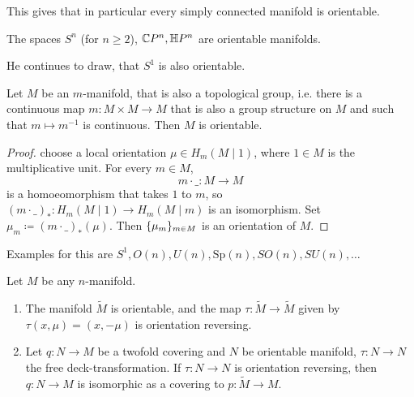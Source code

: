 \documentclass[language=english]{TemplateLecture}
\begin{document}
This gives that in particular every simply connected manifold is orientable.

\begin{example}
    The spaces \(S^n\) (for \(n \geq 2\)), \(\mathbb{C} P^n, \mathbb{H} P^n\) are orientable manifolds.

    He continues to draw, that \(S^1\) is also orientable.

    Let \(M\) be an \(m\)-manifold, that is also a topological group, i.e. there is a continuous map \(m\colon M \times M \to M\) that is also a group structure on \(M\) and such that \(m \mapsto m^{-1}\) is continuous. Then \(M\) is orientable.

    \begin{proof}
        choose a local orientation \(\mu \in H_m(M \mid 1)\), where \(1 \in M\) is the multiplicative unit. For every \(m \in M\),
        \[m\cdot \_\colon M \to M\]
        is a homoeomorphism that takes \(1\) to \(m\), so \((m\cdot \_)_* \colon H_m(M \mid1) \to H_m(M \mid m)\) is an isomorphism. Set \(\mu_m\coloneq (m\cdot \_)_*(\mu)\). Then \(\{\mu_m\}_{m \in M}\) is an orientation of \(M\).
    \end{proof}

    Examples for this are \(S^1, O(n), U(n), \mathrm{Sp}(n), SO(n), SU(n), \dots\)
\end{example}

\begin{proposition}
    Let \(M\) be any \(n\)-manifold.
    \begin{enumerate}
        \item The manifold \(\tilde M\) is orientable, and the map \(\tau \colon \tilde M \to \tilde M\) given by \(\tau(x, \mu) = (x, -\mu)\) is orientation reversing.
        \item Let \(q \colon N \to M\) be a twofold covering and \(N\) be orientable manifold, \(\tau \colon N \to N\) the free deck-transformation. If \(\tau \colon N \to N\) is orientation reversing, then \(q\colon N \to M\) is isomorphic as a covering to \(p\colon \tilde M \to M\).
    \end{enumerate}
\end{proposition}
\end{document}
